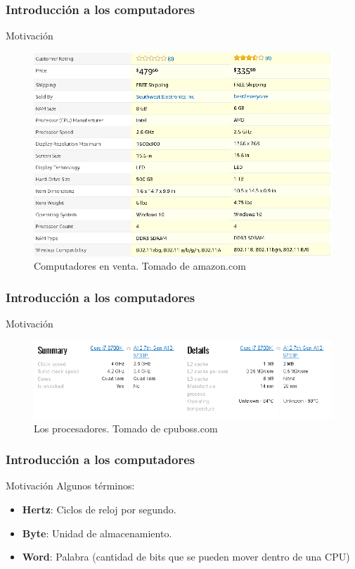 \documentclass{beamer}
\begin{document}
	\begin{frame}
 		\frametitle{Introducción a los computadores}
		\begin{block}{Motivación}
\begin{figure}[H]
\centering
\includegraphics[scale=0.35]{imagenes/pc1.png}
\caption{Computadores en venta. Tomado de amazon.com}
\end{figure}

		\end{block}
	\end{frame}
	
	
	\begin{frame}
 		\frametitle{Introducción a los computadores}
		\begin{block}{Motivación}
\begin{figure}[H]
\centering
\includegraphics[scale=0.5]{imagenes/pc2.png}
\caption{Los procesadores. Tomado de cpuboss.com}
\end{figure}

		\end{block}
	\end{frame}

	\begin{frame}
 		\frametitle{Introducción a los computadores}
		\begin{block}{Motivación}
		Algunos términos:
		\begin{itemize}
			\item \textbf{Hertz}: Ciclos de reloj por segundo. 
			\item \textbf{Byte}: Unidad de almacenamiento.
			\item \textbf{Word}: Palabra (cantidad de bits que se pueden mover dentro de una CPU)
		\end{itemize}
		\end{block}
	\end{frame}
\end{document}
